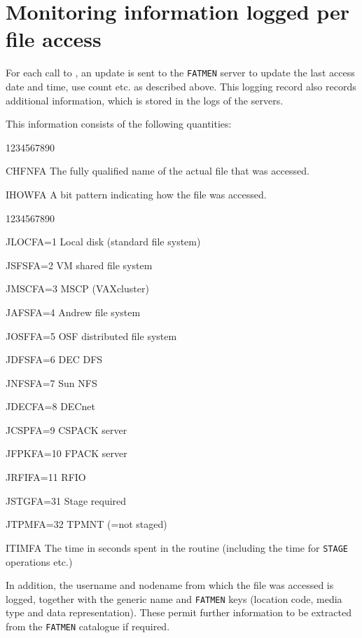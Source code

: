\section{Monitoring information logged per file access}

For each call to , an update is sent to
the {\tt FATMEN} server to update the last access date
and time, use count etc. as described above.
This logging record also records additional information,
which is stored in the logs of the servers.

This information consists of the following quantities:

\begin{DLtt}{1234567890}
\item[CHFNFA]The fully qualified name of the actual file that
was accessed. 
\item[IHOWFA]A bit pattern indicating how the file was accessed.
\begin{DLtt}{1234567890}
\item[JLOCFA=1]Local disk (standard file system)
\item[JSFSFA=2]VM shared file system
\item[JMSCFA=3]MSCP (VAXcluster)
\item[JAFSFA=4]Andrew file system
\item[JOSFFA=5]OSF distributed file system
\item[JDFSFA=6]DEC DFS
\item[JNFSFA=7]Sun NFS
\item[JDECFA=8]DECnet
\item[JCSPFA=9]CSPACK server
\item[JFPKFA=10]FPACK server
\item[JRFIFA=11]RFIO
\item[JSTGFA=31]Stage required
\item[JTPMFA=32]TPMNT (=not staged)
\end{DLtt}
\item[ITIMFA]The time in seconds spent in the routine 
 (including the time for {\tt STAGE} operations etc.)
\end{DLtt}

In addition, the username and nodename from which the file
was accessed is logged, together with the generic name
and {\tt FATMEN} keys (location code, media type and data representation).
These permit further information to be extracted from the {\tt FATMEN}
catalogue if required.


